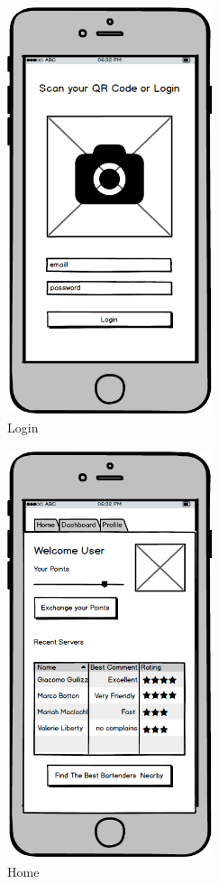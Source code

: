 \documentclass{scrreprt}
\begin{document}
\begin{figure}[!htb]
    \includegraphics[width=6cm, height=12cm]{mockups/Login}
    \centering
    \caption{Login}
\end{figure}

\begin{figure}[!htb]
    \includegraphics[width=6cm, height=12cm]{mockups/Home}
    \centering
    \caption{Home}
\end{figure}
\end{document}
